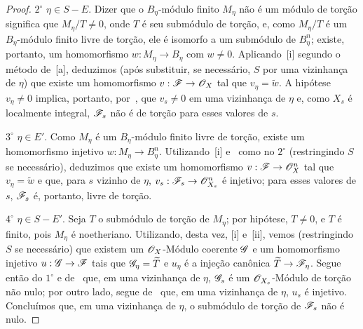 \begin{proof}
$2^\circ$ $\eta\in S-E$.
Dizer que o $B_\eta$-módulo finito $M_\eta$ não é um módulo de torção significa que $M_\eta/T\neq0$, onde $T$ é seu submódulo de torção, e, como $M_\eta/T$ é um $B_\eta$-módulo finito livre de torção, ele é isomorfo a um submódulo de $B_\eta^n$; existe, portanto, um homomorfismo $w:M_\eta\to B_\eta$ com $w\neq0$.
Aplicando~[i] segundo o método de~[a], deduzimos \textnormal{(}após substituir, se necessário, $S$ por uma vizinhança de $\eta$\textnormal{)} que existe um homomorfismo $v:\sh{F}\to\sh{O}_X$ tal que $v_\eta=\widetilde{w}$.
A hipótese $v_\eta\neq0$ implica, portanto, por~, que $v_s\neq0$ em uma vizinhança de $\eta$ e, como $X_s$ é localmente integral, $\mathscr{F}_s$ não é de torção para esses valores de $s$.

$3^\circ$ $\eta\in E'$.
Como $M_\eta$ é um $B_\eta$-módulo finito livre de torção, existe um homomorfismo injetivo $w:M_\eta\to B_\eta^n$.
Utilizando~[i] e~ como no $2^\circ$ \textnormal{(}restringindo $S$ se necessário\textnormal{)}, deduzimos que existe um homomorfismo $v:\sh{F}\to\sh{O}_X^n$ tal que $v_\eta=\widetilde{w}$ e que, para $s$ vizinho de $\eta$, $v_s:\sh{F}_s\to\sh{O}_{X_s}^n$ é injetivo; para esses valores de $s$, $\mathscr{F}_s$ é, portanto, livre de torção.

$4^\circ$ $\eta\in S-E'$.
Seja $T$ o submódulo de torção de $M_\eta$; por hipótese, $T\neq0$, e $T$ é finito, pois $M_\eta$ é noetheriano.
Utilizando, desta vez, [i] e~[ii], vemos \textnormal{(}restringindo $S$ se necessário\textnormal{)} que existem um $\mathscr{O}_X$-Módulo coerente $\mathscr{G}$ e um homomorfismo injetivo $u:\sh{G}\to\sh{F}$ tais que $\mathscr{G}_\eta=\widetilde{T}$ e $u_\eta$ é a injeção canônica $\widetilde{T}\to\sh{F}_\eta$.
Segue então do $1^\circ$ e de~ que, em uma vizinhança de $\eta$, $\mathscr{G}_s$ é um $\mathscr{O}_{X_s}$-Módulo de torção não nulo; por outro lado, segue de~ que, em uma vizinhança de $\eta$, $u_s$ é injetivo.
Concluímos que, em uma vizinhança de $\eta$, o submódulo de torção de $\mathscr{F}_s$ não é nulo.
\end{proof}

